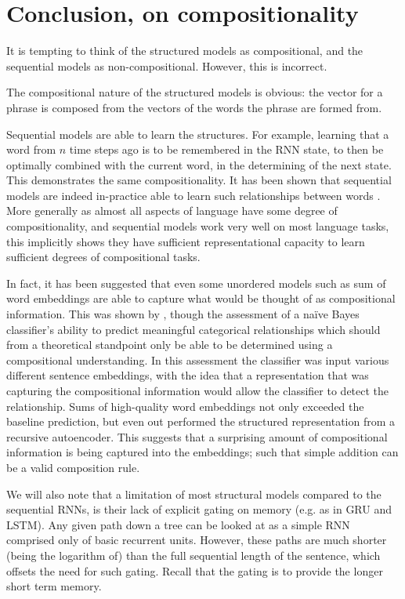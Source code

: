 \documentclass[12pt,parskip]{komatufte}
\begin{document}


\section{Conclusion, on compositionality}
It is tempting to think of the structured models as compositional,
and the sequential models as non-compositional.
However, this is incorrect.

The compositional nature of the structured models is obvious:
the vector for a phrase is composed from the vectors of the words the phrase are formed from.

Sequential models are able to learn  the structures.
For example, learning that a word from $n$ time steps ago is to be remembered in the RNN state, to then be optimally combined with the current word, in the determining of the next state.
This demonstrates the same compositionality.
It has been shown that sequential models are indeed in-practice able to learn such relationships between words .
More generally as almost all aspects of language have some degree of compositionality, and sequential models work very well on most language tasks, this implicitly shows they have sufficient representational capacity to learn sufficient degrees of compositional tasks.


In fact, it has been suggested that even some unordered models such as sum of word embeddings are able to capture what would be thought of as compositional information.
This was shown by \textcite{RitterPosition}, though the assessment of a na\"ive Bayes classifier's ability to predict meaningful categorical relationships which should from a theoretical standpoint only be able to be determined using a compositional understanding.
In this assessment the classifier was input various different sentence embeddings,
with the idea that a representation that was capturing the compositional information would allow the classifier to detect the relationship.
Sums of high-quality word embeddings not only exceeded the baseline prediction, but even out performed the structured representation from a recursive autoencoder.
This suggests that a surprising amount of compositional information is being captured into the embeddings;
such  that simple addition can be a valid composition rule.

We will also note that a limitation of most structural models compared to the sequential RNNs,
is their lack of explicit gating on memory (e.g. as in GRU and LSTM).
Any given path down a tree can be looked at as a simple RNN comprised only of basic recurrent units.
However, these paths are much shorter (being the logarithm of) than the full sequential length of the sentence,
which offsets the need for such gating.
Recall that the gating is to provide the longer short term memory.
\end{document}
